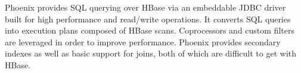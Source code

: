 \documentclass{vldb}
\begin{document}
Phoenix provides SQL querying over HBase via an embeddable JDBC 
driver built for high performance and read/write operations. It 
converts SQL queries into execution plans composed of 
HBase scans. Coprocessors and custom filters are  leveraged
in order to improve performance.  Phoenix provides secondary indexes as
 well as basic support for joins, both of which are difficult to 
get with HBase. 




\balance
\end{document}
